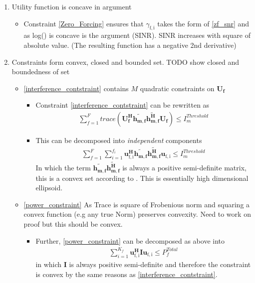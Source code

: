 \documentclass[12pt]{article}
\begin{document}
\begin{enumerate}
\item Utility function is concave in argument 
\begin{itemize}
\item Constraint \eqref{Zero_Forcing} ensures that $\gamma_{\mathrm{f,i}}$ takes the form of \eqref{zf_snr} and  as log() is concave is the argument (SINR). SINR increases with square of absolute value. (The resulting function has a negative 2nd derivative)

\end{itemize}

\item Constraints form convex, closed and bounded set. TODO show closed and boundedness of set

\begin{itemize}

\item\eqref{interference_contstraint} contains $M$ quadratic constraints on $\mathbf{U_f}$
\begin{itemize}
\item Constraint \eqref{interference_contstraint} can be rewritten as 
\begin{gather}
\sum_{f=1}^F
trace(\mathbf{U_f^H} \mathbf{\tilde{h_{m,f}}} \mathbf{\tilde{h_{m,f}^H}} \mathbf{U_f} )\leq I^{Threshold}_{m}
\end{gather}
\item This can be decomposed into \textit{independent} components 
\begin{gather}
\sum_{f=1}^F
\sum_{i=1}^{f_i}
\mathbf{u_{\mathrm{f,i}}^H} \mathbf{\tilde{h_{m,f}}} \mathbf{\tilde{h_{m,f}^H}} \mathbf{u_{\mathrm{f,i}}} \leq I^{Threshold}_{m}
\end{gather}
In which the term $ \mathbf{\tilde{h_{m,f}}} \mathbf{\tilde{h_{m,f}^H}}$ is always a positive semi-definite matrix, this is a convex set according to 
\cite[p.30]{boyd2004convex}. This is essentially high dimensional ellipsoid.


\end{itemize}

\item\eqref{power_constraint} As Trace is square of Frobenious norm and squaring a convex function (e.g any true Norm) preserves convexity.
Need to work on proof but this should be convex.
\begin{itemize}
\item Further, \eqref{power_constraint} can be decomposed as above into
\begin{gather}
\sum_{i=1}^{K_f}\mathbf{u_{\mathrm{f,i}}^H} \mathbf{I} \mathbf{u_{\mathrm{f,i}}} \leq  P^{Total}_{f}
\end{gather}
in which $\mathbf{I}$ is always positive semi-definite and therefore the constraint is convex by the same reasons as \eqref{interference_contstraint}.
\end{itemize}


\end{itemize}
\end{enumerate}
\end{document}
